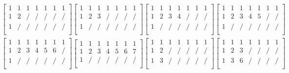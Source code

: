 \begin{gather*}
	\begin{bmatrix}
		1 & 1 & 1 & 1 & 1 & 1 & 1 \\
		1 & 2 & / & / & / & / & / \\
		1 & / & / & / & / & / & / \\
	\end{bmatrix}
	\begin{bmatrix}
		1 & 1 & 1 & 1 & 1 & 1 & 1 \\
		1 & 2 & 3 & / & / & / & / \\
		1 & / & / & / & / & / & / \\
	\end{bmatrix}
	\begin{bmatrix}
		1 & 1 & 1 & 1 & 1 & 1 & 1 \\
		1 & 2 & 3 & 4 & / & / & / \\
		1 & / & / & / & / & / & / \\
	\end{bmatrix}
	\begin{bmatrix}
		1 & 1 & 1 & 1 & 1 & 1 & 1 \\
		1 & 2 & 3 & 4 & 5 & / & / \\
		1 & / & / & / & / & / & / \\
	\end{bmatrix}
	\\
	\begin{bmatrix}
		1 & 1 & 1 & 1 & 1 & 1 & 1 \\
		1 & 2 & 3 & 4 & 5 & 6 & / \\
		1 & / & / & / & / & / & / \\
	\end{bmatrix}
	\begin{bmatrix}
		1 & 1 & 1 & 1 & 1 & 1 & 1 \\
		1 & 2 & 3 & 4 & 5 & 6 & 7 \\
		1 & / & / & / & / & / & / \\
	\end{bmatrix}
	\begin{bmatrix}
		1 & 1 & 1 & 1 & 1 & 1 & 1 \\
		1 & 2 & / & / & / & / & / \\
		1 & 3 & / & / & / & / & / \\
	\end{bmatrix}
	\begin{bmatrix}
		1 & 1 & 1 & 1 & 1 & 1 & 1 \\
		1 & 2 & 3 & / & / & / & / \\
		1 & 3 & 6 & / & / & / & / \\

\end{bmatrix}
\end{gather*}
